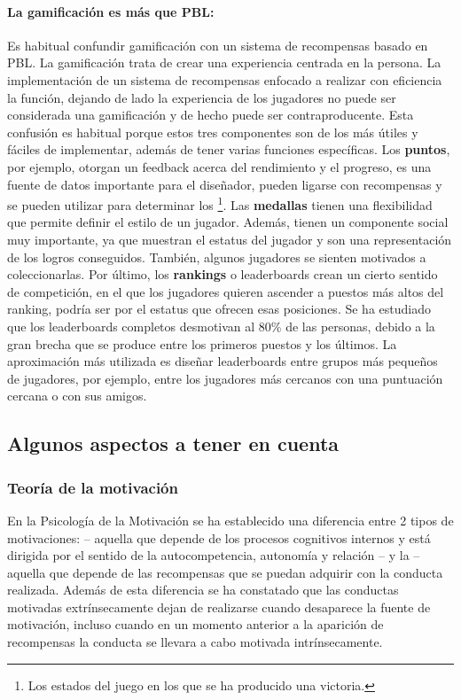 \paragraph{La gamificación es más que \gls{PBL}:} Es habitual confundir gamificación con un sistema de recompensas basado en \gls{PBL}. 
%
La gamificación trata de crear una experiencia centrada en la persona. 
%
La implementación de un sistema de recompensas enfocado a realizar con eficiencia la función, dejando de lado la experiencia de los jugadores no puede ser considerada una gamificación y de hecho puede ser contraproducente.
%
Esta confusión es habitual porque estos tres componentes son de los más útiles y fáciles de implementar, además de tener varias funciones específicas.
%
Los \textbf{puntos}, por ejemplo, otorgan un feedback acerca del rendimiento y el progreso, es una fuente de datos importante para el diseñador, pueden ligarse con recompensas y se pueden utilizar para determinar los \footnote{Los estados del juego en los que se ha producido una victoria.}.
%
Las \textbf{medallas} tienen una flexibilidad que permite definir el estilo de un jugador. 
%
Además, tienen un componente social muy importante, ya que muestran el estatus del jugador y son una representación de los logros conseguidos. 
%
También, algunos jugadores se sienten motivados a coleccionarlas.
%
Por último, los \textbf{rankings} o leaderboards crean un cierto sentido de competición, en el que los jugadores quieren ascender a puestos más altos del ranking, podría ser por el estatus que ofrecen esas posiciones.
%
Se ha estudiado que los leaderboards completos desmotivan al 80\% de las personas, debido a la gran brecha que se produce entre los primeros puestos y los últimos.
%
La aproximación más utilizada es diseñar leaderboards entre grupos más pequeños de jugadores, por ejemplo, entre los jugadores más cercanos con una puntuación cercana o con sus amigos.

\subsection{Algunos aspectos a tener en cuenta}

\subsubsection{Teoría de la motivación}
\label{SDT}
En la Psicología de la Motivación se ha establecido una diferencia entre 2 tipos de motivaciones\cite{SDT}:   -- aquella que depende de los procesos cognitivos internos y está dirigida por el sentido de la autocompetencia, autonomía y relación -- y la  -- aquella que depende de las recompensas que se puedan adquirir con la conducta realizada.
%
Además de esta diferencia se ha constatado que las conductas motivadas extrínsecamente dejan de realizarse cuando desaparece la fuente de motivación, incluso cuando en un momento anterior a la aparición de recompensas la conducta se llevara a cabo motivada intrínsecamente.

